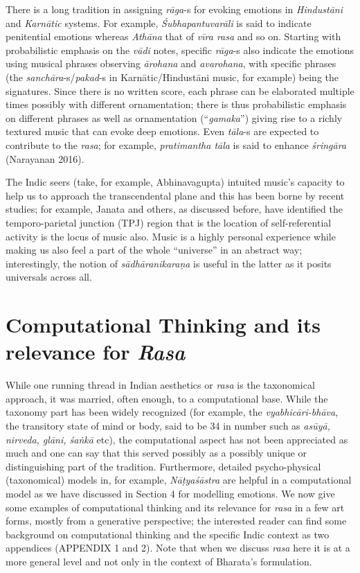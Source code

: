 There is a long tradition in assigning \textsl{rāga}-s for evoking emotions in \textsl{Hindustāni} and \textsl{Karnātic} systems. For example, \textsl{Śubhapantuvarāli} is said to indicate penitential emotions whereas \textsl{Athāna} that of \textsl{vīra rasa} and so on. Starting with probabilistic emphasis on the \textsl{vādi} notes, specific \textsl{rāga}-s also indicate the emotions using musical phrases observing \textsl{ārohana} and \textsl{avarohana}, with specific phrases (the \textsl{sanchāra}-s/\textsl{pakad}-s in Karnātic/Hindustāni music, for example) being the signatures. Since there is no written score, each phrase can be elaborated multiple times possibly with different ornamentation; there is thus probabilistic emphasis on different phrases as well as ornamentation (“\textsl{gamaka}”) giving rise to a richly textured music that can evoke deep emotions. Even \textsl{tāla}-s are expected to contribute to the \textsl{rasa}; for example, \textsl{pratimantha tāla} is said to enhance \textsl{śringāra} (Narayanan 2016). 

The Indic seers (take, for example, Abhinavagupta) intuited music’s capacity to help us to approach the transcendental plane and this has been borne by recent studies; for example, Janata and others, as discussed before, have identified the temporo-parietal junction (TPJ) region that is the location of self-referential activity is the locus of music also. Music is a highly personal experience while making us also feel a part of the whole “universe” in an abstract way; interestingly, the notion of \textsl{sādhāranikaraṇa} is useful in the latter as it posits universals across all.

\section{Computational Thinking and its relevance for \textsl{Rasa}}\label{chap7-sec5}

While one running thread in Indian aesthetics or \textsl{rasa} is the taxonomical approach, it was married, often enough, to a computational base. While the taxonomy part has been widely recognized (for example, the \textsl{vyabhicāri-bhāva}, the transitory state of mind or body, said to be 34 in number such as \textsl{asūyā, nirveda, glāni, śaṅkā} etc), the computational aspect has not been appreciated as much and one can say that this served possibly as a possibly unique or distinguishing part of the tradition. Furthermore, detailed psycho-physical (taxonomical) models in, for example, \textsl{Nāṭyaśāstra} are helpful in a computational model as we have discussed in Section 4 for modelling emotions. We now give some examples of computational thinking and its relevance for \textsl{rasa} in a few art forms, mostly from a generative perspective; the interested reader can find some background on computational thinking and the specific Indic context as two appendices (APPENDIX 1 and 2). Note that when we discuss \textsl{rasa} here it is at a more general level and not only in the context of Bharata’s formulation.

